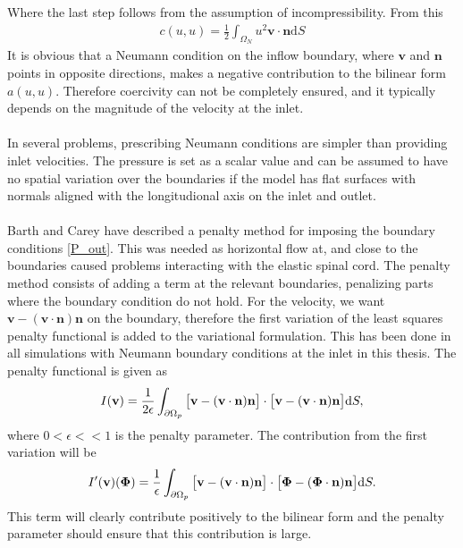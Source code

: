 Where the last step follows from the assumption of incompressibility. From this
\begin{align}
c(u,u) = \frac{1}{2}\int_{\Omega_N} u^2 \mathbf{v} \cdot \mathbf{n} \mathrm{d}S
\end{align}
It is obvious that a Neumann condition on the inflow boundary, where $\mathbf{v}$ and $\mathbf{n}$ points in opposite directions, makes a negative contribution to the bilinear form $a(u,u)$. Therefore coercivity can not be completely ensured, and it typically depends on the magnitude of the velocity at the inlet. 
\\
\\
In several problems, prescribing Neumann conditions are simpler than providing inlet velocities. The pressure is set as a scalar value and can be assumed to have no spatial variation over the boundaries if the model has flat surfaces with normals aligned with the longitudional axis on the inlet and outlet. 
\\
\\
Barth and Carey \cite{Bart07} have described a penalty method for imposing the boundary conditions \eqref{P_out}. This was needed as horizontal flow at, and close to the boundaries caused problems interacting with the elastic spinal cord. The penalty method consists of adding a term at the relevant boundaries, penalizing parts where the boundary condition do not hold. For the velocity, we want $\mathbf{v} - (\mathbf{v}\cdot \mathbf{n})\mathbf{n}$ on the boundary, therefore the first variation of the least squares penalty functional is added to the variational formulation. This has been done in all simulations with Neumann boundary conditions at the inlet in this thesis. The penalty functional is given as
\begin{align}
I(\mathbf{v}) = \frac{1}{2\epsilon}\int_{\partial \Omega_p}\big{[}\mathbf{v} - (\mathbf{v}\cdot \mathbf{n})\mathbf{n}\big{]}\cdot\big{[}\mathbf{v} - (\mathbf{v}\cdot \mathbf{n})\mathbf{n}\big{]} \mathrm{d}S,
\end{align}
where $0<\epsilon<<1$ is the penalty parameter. The contribution from the first variation will be
\begin{align}
I'(\mathbf{v})(\mathbf{\Phi}) = \frac{1}{\epsilon}\int_{\partial \Omega_p}\big{[}\mathbf{v} - (\mathbf{v}\cdot \mathbf{n})\mathbf{n}\big{]}\cdot\big{[}\mathbf{\Phi} - (\mathbf{\Phi}\cdot \mathbf{n})\mathbf{n}\big{]} \mathrm{d}S.
\end{align}
This term will clearly contribute positively to the bilinear form and the penalty parameter should ensure that this contribution is large.
